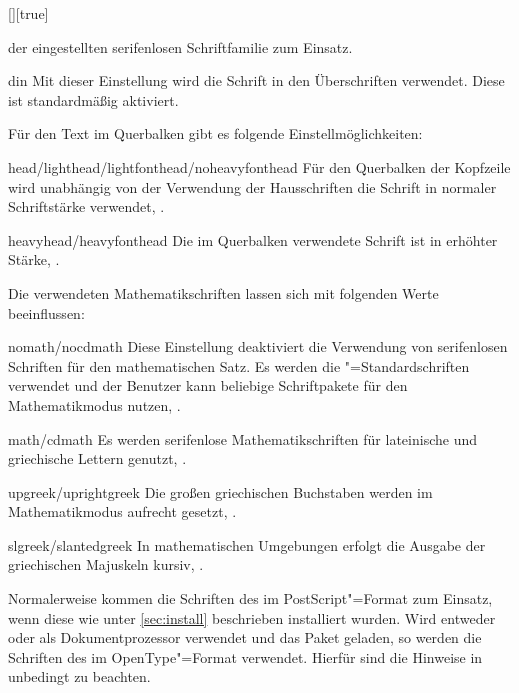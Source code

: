 \begin{Declaration}{[\PSet]}[true]
\begin{values}
  der eingestellten serifenlosen Schriftfamilie zum Einsatz.
\item[din]
  Mit dieser Einstellung wird die Schrift \DIN in den Überschriften verwendet. 
  Diese ist standardmäßig aktiviert.
\end{values}
%
Für den Text im Querbalken gibt es folgende Einstellmöglichkeiten:
%
\begin{values}
\item[head/lighthead/lightfonthead/noheavyfonthead]
  Für den Querbalken der Kopfzeile wird unabhängig von der Verwendung der 
  Hausschriften die Schrift \Univers in normaler Schriftstärke verwendet,
  .
\item[heavyhead/heavyfonthead]
  Die im Querbalken verwendete Schrift ist \Univers in erhöhter Stärke, 
  .
\end{values}
%
Die verwendeten Mathematikschriften lassen sich mit folgenden Werte 
beeinflussen:
%
\begin{values}
\item[nomath/nocdmath]  
  Diese Einstellung deaktiviert die Verwendung von serifenlosen Schriften für 
  den mathematischen Satz. Es werden die "=Standardschriften 
  verwendet und der Benutzer kann beliebige Schriftpakete für den 
  Mathematikmodus nutzen, .
\item[math/cdmath]
  Es werden serifenlose Mathematikschriften für lateinische und griechische 
  Lettern genutzt, .
\item[upgreek/uprightgreek]
  Die großen griechischen Buchstaben werden im Mathematikmodus aufrecht gesetzt,
  .
\item[slgreek/slantedgreek]
  In mathematischen Umgebungen erfolgt die Ausgabe der griechischen Majuskeln 
  kursiv, .
\end{values}
%
Normalerweise kommen die Schriften des \CDs im PostScript"=Format zum Einsatz, 
wenn diese wie unter \autoref{sec:install} beschrieben installiert wurden.
Wird entweder  oder  als Dokumentprozessor 
verwendet und das Paket  geladen, so werden die Schriften des 
\CDs im OpenType"=Format verwendet. Hierfür sind die Hinweise in 
 unbedingt zu beachten.
\end{Declaration}


